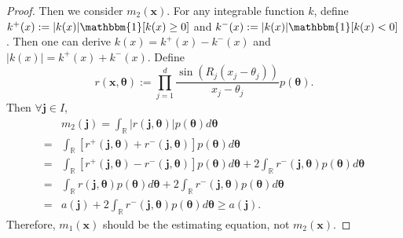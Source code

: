 \documentclass[%
 reprint,
 amsmath,amssymb,
 aps,
]{revtex4-2}
\def\R{\mathbb{R}}
\def\btheta{\boldsymbol{\theta}}
\def\btheta{\boldsymbol{\theta}}
\def\xbold{\mathbf{x}}
\newcommand{\btheta}{\mbox{\boldmath $\theta$}}
\begin{document}
\begin{proof}
    Then we consider $m_2(\xbold)$. For any integrable function $k$, define $k^+(x) := |k(x)|\mathbbm{1}[k(x) \ge 0]$ and $k^-(x) := |k(x)|\mathbbm{1}[k(x) < 0]$. Then one can derive $k(x) = k^+(x) - k^-(x)$ and $|k(x)| = k^+(x) + k^-(x)$. Define
    \begin{equation*}
        r(\xbold, \btheta) := \prod_{j = 1}^d \frac{\sin(R_j(x_j - \theta_j))}{x_j - \theta_j} p(\btheta).
    \end{equation*}
    Then $\forall \mathbf{j} \in I$,
    \begin{align*}
        & m_2(\mathbf{j}) = \int_\R |r(\mathbf{j}, \btheta)|p(\btheta)d\btheta \\
        = & \int_\R [r^+(\mathbf{j}, \btheta) + r^-(\mathbf{j}, \btheta)]p(\btheta)d\btheta \\
        = & \int_\R [r^+(\mathbf{j}, \btheta) - r^-(\mathbf{j}, \btheta)]p(\btheta)d\btheta + 2\int_\R r^-(\mathbf{j}, \btheta)p(\btheta)d\btheta \\
        = & \int_\R r(\mathbf{j}, \btheta)p(\btheta)d\btheta + 2\int_\R r^-(\mathbf{j}, \btheta)p(\btheta)d\btheta \\
        = & a(\mathbf{j}) + 2\int_\R r^-(\mathbf{j}, \btheta)p(\btheta)d\btheta \ge a(\mathbf{j}).
    \end{align*}
Therefore, $m_1(\xbold)$ should be the estimating equation, not $m_2(\xbold)$.
\end{proof}
\end{document}

